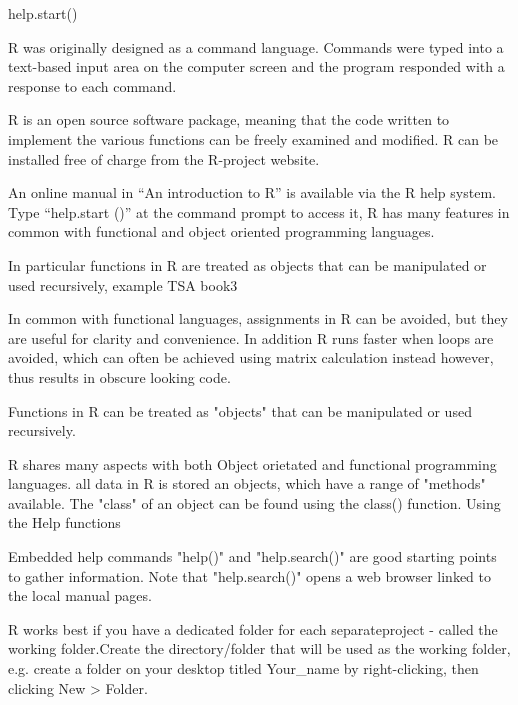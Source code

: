 \begin{frame}
\begin{frame}
help.start()

 
 

R was originally designed as a command language.  
Commands were typed into a text-based input area on the computer screen and the program responded with a response to each command.

R is an open source software package, meaning that the code written to implement the various functions can be freely examined and modified.
R can be installed free of charge from the R-project website.

An online manual in “An introduction to R” is available via the R help system. Type “help.start ()” at the command prompt to access it, R   has many features in common with functional and object oriented programming languages.



In particular functions in R are treated as objects that can be manipulated or used recursively, example TSA book3

In common with functional languages, assignments in R can be avoided, but they are useful for clarity and convenience. In addition R runs faster when loops are avoided, which can often be achieved using matrix calculation instead however, thus results in obscure looking code.

\end{frame}
\begin{frame}

Functions in R can be treated as "objects" that can be manipulated or used recursively.

R shares many aspects with both Object orietated and functional programming languages. all data in R is stored an objects, which have a range of "methods" available. The "class" of an object can be found using the class() function.
Using the Help functions

\end{frame}
\begin{frame}
Embedded help commands "help()" and "help.search()" are good starting points to gather information.
Note that "help.search()" opens a web browser linked to the local manual pages.
 

R works best if you have a dedicated folder for each separateproject - called the working folder.Create the directory/folder that will be used as the working folder, e.g. create a folder on your desktop titled Your_name by right-clicking, then clicking New > Folder. 
 

\end{frame}
\end{frame}
